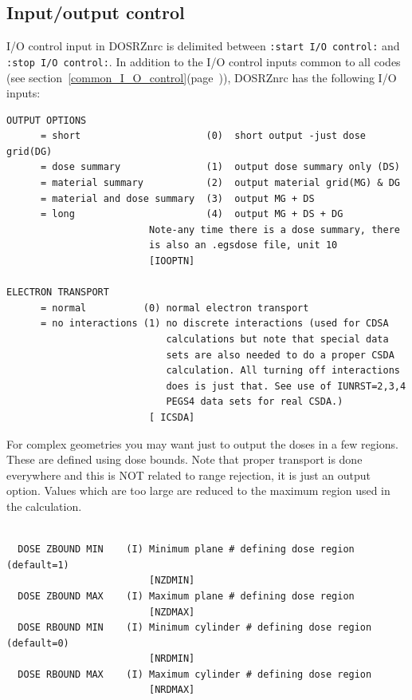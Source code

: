 \documentclass[12pt,twoside]{article}  %
\newcommand{\lpage}[1]{(page~\pageref{#1})}
\begin{document}
\subsection{Input/output control}

I/O control input in DOSRZnrc is delimited between \verb+:start I/O control:+
and\\ \verb+:stop I/O control:+.  In addition to the I/O control inputs
common to all codes (see
section~\ref{common_I_O_control}\lpage{common_I_O_control}),
DOSRZnrc has the following I/O inputs:

\begin{verbatim}
OUTPUT OPTIONS
      = short                      (0)  short output -just dose grid(DG)
      = dose summary               (1)  output dose summary only (DS)
      = material summary           (2)  output material grid(MG) & DG
      = material and dose summary  (3)  output MG + DS
      = long                       (4)  output MG + DS + DG
                         Note-any time there is a dose summary, there
                         is also an .egsdose file, unit 10
                         [IOOPTN]

ELECTRON TRANSPORT
      = normal          (0) normal electron transport
      = no interactions (1) no discrete interactions (used for CDSA
                            calculations but note that special data
                            sets are also needed to do a proper CSDA
                            calculation. All turning off interactions
                            does is just that. See use of IUNRST=2,3,4
                            PEGS4 data sets for real CSDA.)
                         [ ICSDA]
\end{verbatim}
For complex geometries you may want just to output the doses in
a few regions.  These are defined using dose bounds. Note that
proper transport is done everywhere and this is
NOT related to range rejection, it is just an output option.  Values which
are too large are reduced to the maximum region used in the calculation.

\begin{verbatim}

  DOSE ZBOUND MIN    (I) Minimum plane # defining dose region (default=1)
                         [NZDMIN]
  DOSE ZBOUND MAX    (I) Maximum plane # defining dose region
                         [NZDMAX]
  DOSE RBOUND MIN    (I) Minimum cylinder # defining dose region (default=0)
                         [NRDMIN]
  DOSE RBOUND MAX    (I) Maximum cylinder # defining dose region
                         [NRDMAX]
\end{verbatim}
\end{document}
